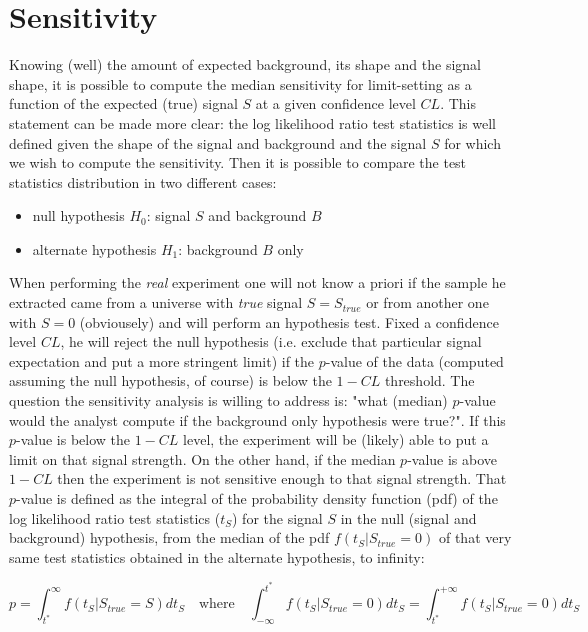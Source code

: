 \documentclass[10pt, oneside]{article}   	%
\begin{document}
\section{Sensitivity}
Knowing (well) the amount of expected background, its shape and the signal shape, it is possible to compute the median sensitivity for limit-setting as a function of the expected (true) signal $S$ at a given confidence level $CL$. This statement can be made more clear: the log likelihood ratio test statistics is well defined given the shape of the signal and background and the signal $S$ for which we wish to compute the sensitivity. Then it is possible to compare the test statistics distribution in two different cases:
\begin{itemize}
\item null hypothesis $H_0$: signal $S$ and background $B$
\item alternate hypothesis $H_1$: background $B$ only
\end{itemize}
When performing the \textit{real} experiment one will not know a priori if the sample he extracted came from a universe with \textit{true} signal $S = S_{true}$ or from another one with $S=0$ (obviousely) and will perform an hypothesis test. Fixed a confidence level $CL$, he will reject the null hypothesis (i.e. exclude that particular signal expectation and put a more stringent limit) if the $p$-value of the data (computed assuming the null hypothesis, of course) is below the $1-CL$ threshold. The question the sensitivity analysis is willing to address is: "what  (median) $p$-value would the analyst compute if the background only hypothesis were true?". If this $p$-value is below the $1-CL$ level, the experiment will be (likely) able to put a limit on that signal strength. On the other hand, if the median $p$-value is above $1-CL$ then the experiment is not sensitive enough to that signal strength. That $p$-value is defined as the integral of the probability density function (pdf) of the log likelihood ratio test statistics ($t_S$) for the signal $S$ in the null (signal and background) hypothesis, from the median of the pdf $f(t_S | S_{true}=0)$ of that very same test statistics obtained in the alternate hypothesis, to infinity:

$$ p = \int_{t^*}^\infty f(t_S | S_{true} = S)dt_S \quad \mathrm{where} \quad \int_{-\infty}^{t^*} f(t_S | S_{true} = 0)dt_S = \int^{+\infty}_{t^*} f(t_S | S_{true} = 0)dt_S  $$
\end{document}
